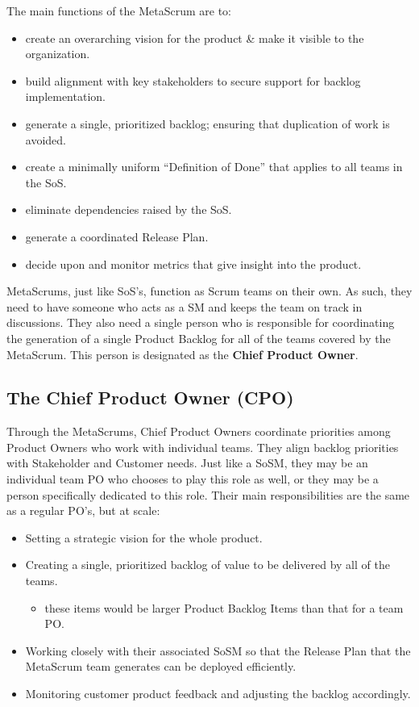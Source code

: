 \documentclass[12pt,a4paper,parskip=full]{scrartcl}
\begin{document}
The main functions of the MetaScrum are to:
\begin{itemize}
\item create an overarching vision for the product \& make it visible to
the organization.
\item build alignment with key stakeholders to secure support for backlog
implementation.
\item generate a single, prioritized backlog; ensuring that duplication of
work is avoided.
\item create a minimally uniform ``Definition of Done'' that applies to all teams in
the SoS.
\item eliminate dependencies raised by the SoS.
\item generate a coordinated Release Plan.
\item decide upon and monitor metrics that give insight into the product.
\end{itemize}
MetaScrums, just like SoS's, function as Scrum teams on their own. As such,
they need to have someone who acts as a SM and keeps the team on track in
discussions. They also need a single person who is responsible for coordinating the
generation of a single Product Backlog for all of the teams covered by the
MetaScrum. This person is designated as the \textbf{Chief Product Owner}.

\subsection{The Chief Product Owner (CPO)}
Through the MetaScrums, Chief Product Owners coordinate priorities among
Product Owners who work with individual teams. They align backlog
priorities with Stakeholder and Customer needs. Just like a SoSM, they may
be an individual team PO who chooses to play this role as well, or they may
be a person specifically dedicated to this role. Their main
responsibilities are the same as a regular PO's, but at scale:
\begin{itemize}
\item Setting a strategic vision for the whole product.
\item Creating a single, prioritized backlog of value to be delivered by
all of the teams.
\begin{itemize}
\item these items would be larger Product Backlog Items than that for a team PO.
\end{itemize}
\item Working closely with their associated SoSM so that the Release Plan
that the MetaScrum team generates can be deployed efficiently.
\item Monitoring customer product feedback and adjusting the backlog
accordingly.
\end{itemize}
\end{document}
